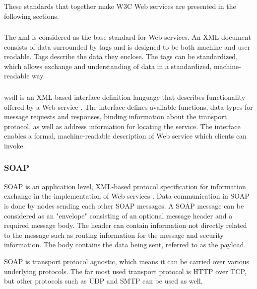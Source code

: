 These standards that together make W3C Web services are presented in the
following sections.

\subsubsection{}

The \gls{xml}\cite{W3C-XML} is considered as the base standard for Web services.
An XML document consists of data surrounded by tags and is designed to be both
machine and user readable. Tags describe the data they enclose. The tags can be
standardized, which allows exchange and understanding of data in a standardized,
machine-readable way.


\subsubsection{}

\gls{wsdl} is an XML-based interface definition language that describes
functionality offered by a Web service \cite{w3c-wsdl}. The interface defines
available functions, data types for message requests and responses, binding
information about the transport protocol, as well as address information for
locating the service. The interface enables a formal, machine-readable
description of Web service which clients can invoke.

\subsubsection{SOAP}

SOAP is an application level, XML-based protocol specification for information
exchange in the implementation of Web services \cite{w3c-soap}. Data
communication in SOAP is done by nodes sending each other SOAP messages. A SOAP
message can be considered as an "envelope" consisting of an optional message
header and a required message body. The header can contain information not
directly related to the message such as routing information for the message and
security information. The body contains the data being sent, referred to as the
payload.

SOAP is transport protocol agnostic, which means it can be carried over various
underlying protocols. The far most used transport protocol is HTTP over TCP, but
other protocols such as UDP and SMTP can be used as well.

\subsection{}
\label{rest}

